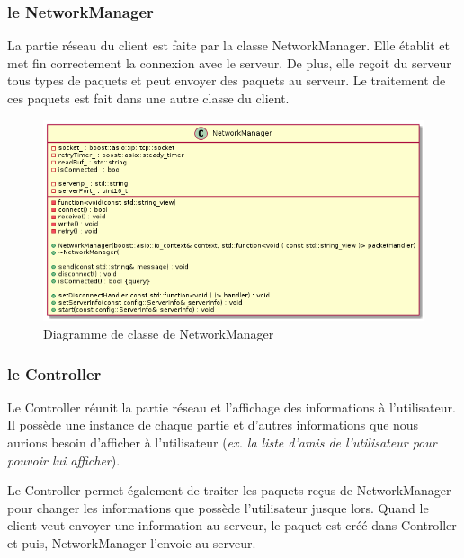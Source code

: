 \documentclass{article}
\begin{document}
\subsubsection{le NetworkManager}

La partie réseau du client est faite par la classe NetworkManager. Elle établit et met fin correctement la connexion avec le serveur. De plus, elle reçoit du serveur tous types de paquets et peut envoyer des paquets au serveur. Le traitement de ces paquets est fait dans une autre classe du client.

\begin{figure}[!ht]
	\centering
	 \includegraphics[scale=0.5]{../../res/uml/class/NetworkManagerClass.png}
	 \caption{Diagramme de classe de NetworkManager}
	 \label{fig:NetworkManagerDiagram}
\end{figure}

\subsubsection{le Controller}

Le Controller réunit la partie réseau et l'affichage des informations à l'utilisateur. Il possède une instance de chaque partie et d'autres informations que nous aurions besoin d'afficher à l'utilisateur (\textit{ex. la liste d'amis de l'utilisateur pour pouvoir lui afficher}). 

Le Controller permet également de traiter les paquets reçus de NetworkManager pour changer les informations que possède l'utilisateur jusque lors. Quand le client veut envoyer une information au serveur, le paquet est créé dans Controller et puis, NetworkManager l'envoie au serveur.
\end{document}

